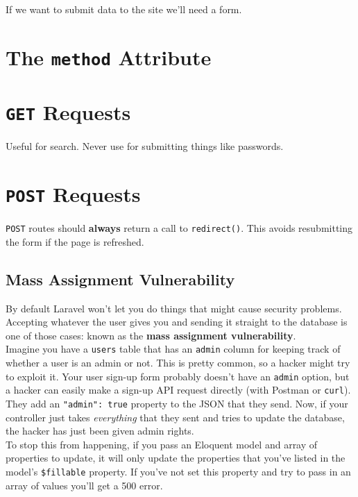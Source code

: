If we want to submit data to the site we'll need a form.

\section{The \texttt{method} Attribute}

\section{\texttt{GET} Requests}

Useful for search. Never use for submitting things like passwords.

\section{\texttt{POST} Requests}

\texttt{POST} routes should \textbf{always} return a call to \texttt{redirect()}. This avoids resubmitting the form if the page is refreshed.

\subsection{Mass Assignment Vulnerability}
By default Laravel won't let you do things that might cause security problems. Accepting whatever the user gives you and sending it straight to the database is one of those cases: known as the \textbf{mass assignment vulnerability}.
\\

Imagine you have a \texttt{users} table that has an \texttt{admin} column for keeping track of whether a user is an admin or not. This is pretty common, so a hacker might try to exploit it. Your user sign-up form probably doesn't have an \texttt{admin} option, but a hacker can easily make a sign-up API request directly (with Postman or \texttt{curl}). They add an \texttt{"admin": true} property to the JSON that they send. Now, if your controller just takes \textit{everything} that they sent and tries to update the database, the hacker has just been given admin rights.
\\

To stop this from happening, if you pass an Eloquent model and array of properties to update, it will only update the properties that you've listed in the model's \texttt{\$fillable} property. If you've not set this property and try to pass in an array of values you'll get a 500 error.
\\

